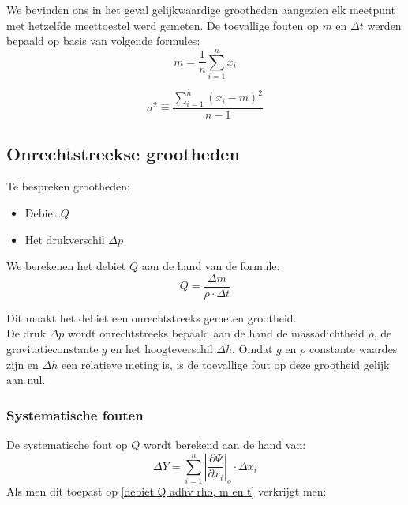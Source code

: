 We bevinden ons in het geval gelijkwaardige grootheden aangezien elk meetpunt met hetzelfde meettoestel werd gemeten.
De toevallige fouten op $m$ en $\Delta t$ werden bepaald op basis van volgende formules:
\begin{equation}
    m = \frac{1}{n} \sum\limits_{i=1}^n x_i
\end{equation}

\begin{equation}
    \sigma^{2} \hat{=} \frac{\sum\limits_{i=1}^n (x_i - m)^2}{n - 1}
\end{equation}



\subsection{Onrechtstreekse grootheden}

Te bespreken grootheden:
\begin{itemize}
    \item Debiet $Q$
    \item Het drukverschil $\Delta p$
\end{itemize}

We berekenen het debiet $Q$ aan de hand van de formule: 
\begin{equation}
\label{debiet Q adhv rho, m en t}
    Q = \frac{\Delta m}{\rho \cdot \Delta t}
\end{equation}

Dit maakt het debiet een onrechtstreeks gemeten grootheid.
\\

De druk $\Delta p$ wordt onrechtstreeks bepaald aan de hand de massadichtheid $\rho$, de gravitatieconstante $g$ en het hoogteverschil $\Delta h$. Omdat $g$ en $\rho$ constante waardes zijn en $\Delta h$ een relatieve meting is, is de toevallige fout op deze grootheid gelijk aan nul.


\subsubsection{Systematische fouten}
De systematische fout op $Q$ wordt berekend aan de hand van:
\begin{equation}
    \Delta Y = \sum\limits_{i=1}^n \left|\frac{\partial \Psi}{\partial x_i}\right|_o \cdot \Delta x_i 
\end{equation}
Als men dit toepast op \eqref{debiet Q adhv rho, m en t} verkrijgt men:

